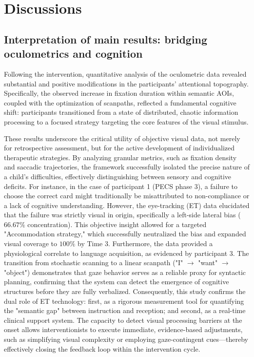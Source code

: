 \section{Discussions}
\subsection{Interpretation of main results: bridging oculometrics and cognition}

Following the intervention, quantitative analysis of the oculometric data revealed substantial and positive modifications in the participants' attentional topography. Specifically, the observed increase in fixation duration within semantic AOIs, coupled with the optimization of scanpaths, reflected a fundamental cognitive shift: participants transitioned from a state of distributed, chaotic information processing to a focused strategy targeting the core features of the visual stimulus.

These results underscore the critical utility of objective visual data, not merely for retrospective assessment, but for the active development of individualized therapeutic strategies. By analyzing granular metrics, such as fixation density and saccadic trajectories, the framework successfully isolated the precise nature of a child's difficulties, effectively distinguishing between sensory and cognitive deficits. For instance, in the case of participant 1 (PECS phase 3), a failure to choose the correct card might traditionally be misattributed to non-compliance or a lack of cognitive understanding. However, the eye-tracking (ET) data elucidated that the failure was strictly visual in origin, specifically a left-side lateral bias ($66.67\%$ concentration). This objective insight allowed for a targeted "Accommodation strategy," which successfully neutralized the bias and expanded visual coverage to $100\%$ by Time 3.
Furthermore, the data provided a physiological correlate to language acquisition, as evidenced by participant 3. The transition from stochastic scanning to a linear scanpath ("I" $\to$ "want" $\to$ "object") demonstrates that gaze behavior serves as a reliable proxy for syntactic planning, confirming that the system can detect the emergence of cognitive structures before they are fully verbalized. Consequently, this study confirms the dual role of ET technology: first, as a rigorous measurement tool for quantifying the "semantic gap" between instruction and reception; and second, as a real-time clinical support system. The capacity to detect visual processing barriers at the onset allows interventionists to execute immediate, evidence-based adjustments, such as simplifying visual complexity or employing gaze-contingent cues—thereby effectively closing the feedback loop within the intervention cycle.

